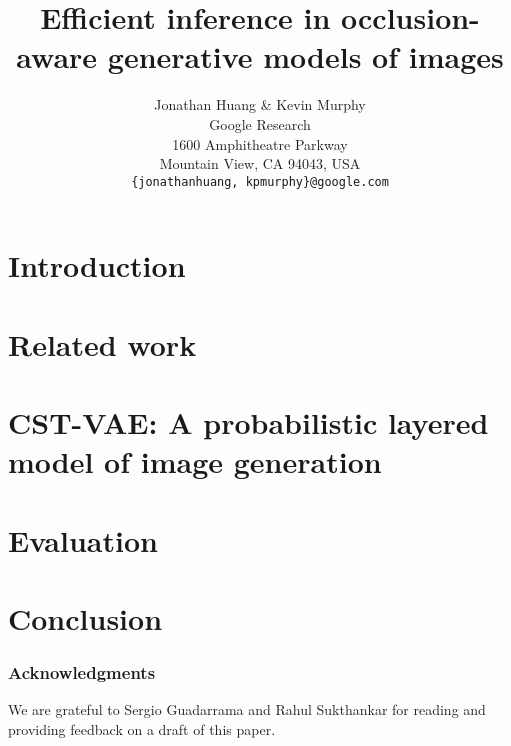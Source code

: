 \documentclass{article} %
\title{Efficient inference in occlusion-aware generative models of images}
\author{Jonathan Huang \& Kevin Murphy \\
Google Research \\
1600 Amphitheatre Parkway \\
Mountain View, CA 94043, USA\\
\texttt{\{jonathanhuang, kpmurphy\}@google.com}
}
\begin{document}
\maketitle



\section{Introduction}


\section{Related work}


\section{CST-VAE: A probabilistic layered model of image generation}


\section{Evaluation}


\section{Conclusion}


%

\subsubsection*{Acknowledgments}
We are grateful to Sergio Guadarrama and Rahul Sukthankar for reading and providing feedback on 
a draft of this paper.



\end{document}
